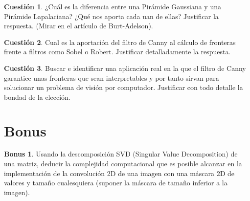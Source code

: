 \documentclass[a4paper, 11pt]{article}
\theoremstyle{definition}
\theoremstyle{theorem}
\newtheorem{cuestion}{Cuestión}
\newtheorem{bonus}{Bonus}
\begin{document}
  \begin{cuestion}
      ¿Cuál es la diferencia entre una Pirámide Gaussiana y una Pirámide Lapalaciana? ¿Qué nos aporta cada uan de ellas? Justificar la respuesta. (Mirar en el artículo de Burt-Adelson).
  \end{cuestion}

  \begin{cuestion}
      Cual es la aportación del filtro de Canny al cálculo de fronteras frente a filtros como Sobel o Robert. Justificar detalladamente la respuesta.
  \end{cuestion}

  \begin{cuestion}
      Buscar e identificar una aplicación real en la que el filtro de Canny garantice unas fronteras que sean interpretables y por tanto sirvan para solucionar un problema de visión por computador. Justificar con todo detalle la bondad de la elección.
  \end{cuestion}

  \section{Bonus}

  \begin{bonus}
      Usando la descomposición SVD (Singular Value Decomposition) de una matriz, deducir la complejidad computacional que es posible alcanzar en la implementación de la convolución 2D de una imagen con una máscara 2D de valores y tamaño cualesquiera (suponer la máscara de tamaño inferior a la imagen).
  \end{bonus}
\end{document}
